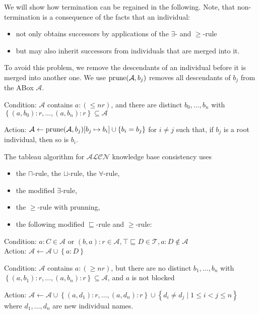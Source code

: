 We will show how termination can be regained in the following.
Note, that non-termination is a consequence of the facts that an individual:
\begin{itemize}
	\item not only obtains successors by applications of the $\exists$- and $ \geq$-rule
	\item but may also inherit successors from individuals that are merged into it.
\end{itemize}

To avoid this problem, we remove the descendants of an individual before it is merged into another one.
We use $\operatorname{\text{prune}}(\mathcal{A},b_j)$ removes all descendants of $b_j$ from the ABox $\mathcal{A}$.
\begin{mdframed}[frametitle= The $ \leq$-rule with prunning]
	Condition: $\mathcal{A}$ contains $a:( \leq nr)$, and there are distinct
	$b_0, \ldots, b_n$ with $\left\{ (a,b_0):r, \ldots, (a,b_n):r \right\} \subseteq \mathcal{A}$

	Action: $\mathcal{A} \leftarrow \operatorname{\text{prune}}(\mathcal{A}, b_j)[b_j \mapsto b_i] \cup \left\{ b_i = b_j \right\}$
	for $i \neq j$ such that, if $b_j$ is a root individual, then so is $b_i$.
\end{mdframed}

The tableau algorithm for $\mathcal{ALCN}$ knowledge base consistency uses
\begin{itemize}
	\item the $\sqcap$-rule, the $\sqcup$-rule, the $\forall$-rule,
	\item the modified $\exists$-rule,
	\item the $ \geq$-rule with prunning,
	\item the following modified $\sqsubseteq$-rule and $ \geq$-rule:
\end{itemize}
\begin{mdframed}[frametitle= The modified $\sqsubseteq$-rule, nobreak = true]
	Condition: $a : C \in \mathcal{A}$ or $ (b,a):r \in \mathcal{A}, \top \sqsubseteq D \in \mathcal{T}, a : D \notin \mathcal{A}$\\
	Action: $\mathcal{A} \leftarrow \mathcal{A} \cup \left\{ a: D \right\}$
\end{mdframed}
\begin{mdframed}[frametitle= The modified $ \geq$-rule, nobreak = true]
	Condition: $\mathcal{A}$ contains $a:( \geq nr)$, but there are no distinct
	$b_1, \ldots, b_n$ with $\left\{ (a,b_1):r, \ldots, (a,b_n):r \right\} \subseteq \mathcal{A}$,
	and $a$ is not blocked

	Action: $\mathcal{A} \leftarrow \mathcal{A} \cup \left\{ (a,d_1):r, \ldots, (a,d_n):r \right\} \cup \left\{ d_i \neq d_j \mid 1 \leq i < j \leq n \right\}$
	where $d_1, \ldots, d_n$ are new individual names.
\end{mdframed}

